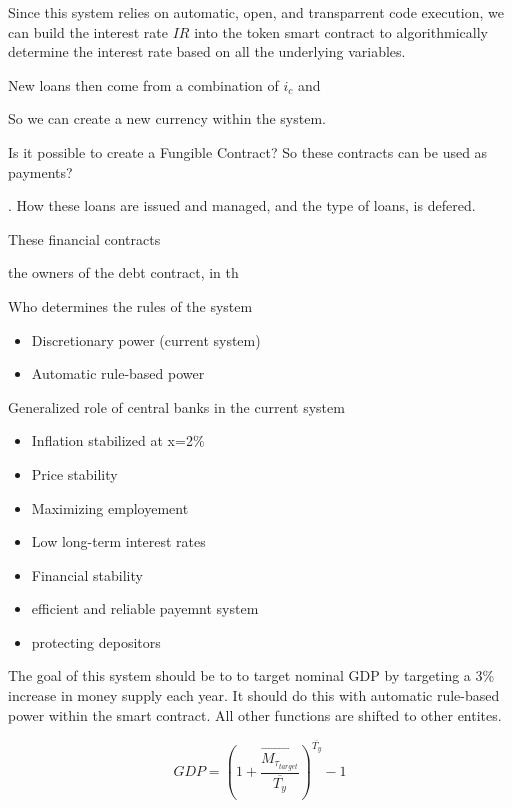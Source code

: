 Since this system relies on automatic, open, and transparrent code execution, we can build the interest rate $IR$ into the token smart contract to algorithmically determine the interest rate based on all the underlying variables. 











New loans then come from a combination of $i_{c}$ and



So we can create a new currency within the system. 




Is it possible to create a Fungible Contract? So these contracts can be used as payments? 




. How these loans are issued and managed, and the type of loans, is defered. 

These financial contracts 


 the owners of the debt contract, in th


Who determines the rules of the system
\begin{itemize}
    \item Discretionary power (current system)
    \item Automatic rule-based power
\end{itemize}

Generalized role of central banks in the current system \cite{Stellinga2021}
\begin{itemize}
    \item Inflation stabilized at x=2\%
    \item Price stability
    \item Maximizing employement
    \item Low long-term interest rates
    \item Financial stability
    \item efficient and reliable payemnt system
    \item protecting depositors 
\end{itemize}

The goal of this system should be to to target nominal GDP by targeting a 3\% increase in money supply each year. It should do this with automatic rule-based power within the smart contract. All other functions are shifted to other entites. 

\begin{equation}
    GDP = (1+\frac{\overrightarrow{M_{\tau_{target}}}}{\overline{T_{y}}})^{\overline{T_{y}}} - 1
\end{equation}




